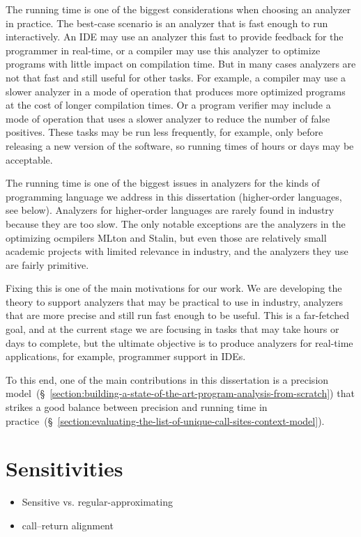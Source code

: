 \documentclass[12pt, oneside]{book}
\begin{document}
The running time is one of the biggest considerations when choosing an analyzer in practice. The best-case scenario is an analyzer that is fast enough to run interactively. An IDE may use an analyzer this fast to provide feedback for the programmer in real-time, or a compiler may use this analyzer to optimize programs with little impact on compilation time. But in many cases analyzers are not that fast and still useful for other tasks. For example, a compiler may use a slower analyzer in a mode of operation that produces more optimized programs at the cost of longer compilation times. Or a program verifier may include a mode of operation that uses a slower analyzer to reduce the number of false positives. These tasks may be run less frequently, for example, only before releasing a new version of the software, so running times of hours or days may be acceptable.

The running time is one of the biggest issues in analyzers for the kinds of programming language we address in this dissertation (higher-order languages, see below). Analyzers for higher-order languages are rarely found in industry because they are too slow. The only notable exceptions are the analyzers in the optimizing ocmpilers MLton and Stalin, but even those are relatively small academic projects with limited relevance in industry, and the analyzers they use are fairly primitive.

Fixing this is one of the main motivations for our work. We are developing the theory to support analyzers that may be practical to use in industry, analyzers that are more precise and still run fast enough to be useful. This is a far-fetched goal, and at the current stage we are focusing in tasks that may take hours or days to complete, but the ultimate objective is to produce analyzers for real-time applications, for example, programmer support in IDEs.

To this end, one of the main contributions in this dissertation is a precision model~(§~\ref{section:building-a-state-of-the-art-program-analysis-from-scratch}) that strikes a good balance between precision and running time in practice~(§~\ref{section:evaluating-the-list-of-unique-call-sites-context-model}).

\section{Sensitivities}
\label{section:sensitivities}

\begin{itemize}
  \item Sensitive vs. regular-approximating
  \item call–return alignment
\end{itemize}
\end{document}
